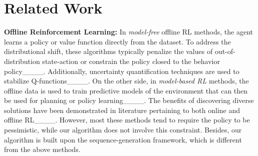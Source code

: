 \section{Related Work}
\label{sec:related_work}
\textbf{Offline Reinforcement Learning:}
In \emph{model-free} offline RL methods, the agent learns a policy or value function directly from the dataset. To address the distributional shift, these algorithms typically penalize the values of out-of-distribution state-action or constrain the policy closed to the behavior policy____. Additionally, uncertainty quantification techniques are used to stabilize Q-functions____. On the other side, in \emph{model-based RL} methods, the offline data is used to train predictive models of the environment that can then be used for planning or policy learning____. 
The benefits of discovering diverse solutions have been demonstrated in literature pertaining to both online and offline RL____.
However, most these methods tend to require the policy to be pessimistic, while our algorithm does not involve this constraint. Besides, our algorithm is built upon the sequence-generation framework, which is different from the above methods.


